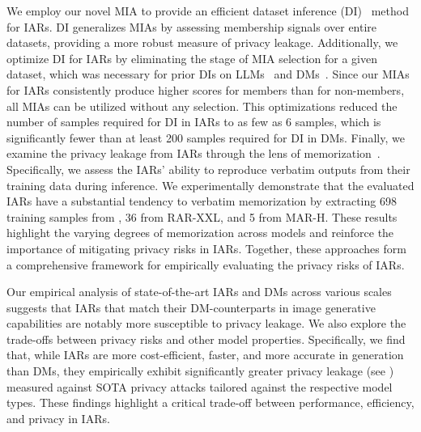 We employ our novel MIA to provide an efficient dataset inference (DI)~\citep{maini2021dataset} method for IARs. DI generalizes MIAs by assessing membership signals over entire datasets, providing a more robust measure of privacy leakage. Additionally, we optimize DI for IARs by eliminating the stage of MIA selection for a given dataset, which was necessary for prior DIs on LLMs~\citep{maini2024llmdatasetinferencedid} and DMs~\citep{dubinski2024cdicopyrighteddataidentification}. Since our MIAs for IARs consistently produce higher scores for members than for non-members, all MIAs can be utilized without any selection. This optimizations reduced the number of samples required for DI in IARs to as few as 6 samples, which is significantly fewer than at least 200 samples required for DI in DMs. 
Finally, we examine the privacy leakage from IARs through the lens of memorization~\citep{feldman2020does,wen2024detecting,huang2024demystifying}. Specifically, we assess the IARs’ ability to reproduce verbatim outputs from their training data during inference.  We experimentally demonstrate that the evaluated IARs have a substantial tendency to verbatim memorization by extracting 698 training samples from \varbig, 36 from RAR-XXL, and 5 from MAR-H. These results highlight the varying degrees of memorization across models and reinforce the importance of mitigating privacy risks in IARs. Together, these approaches form a comprehensive framework for empirically evaluating the privacy risks of IARs.




Our empirical analysis of state-of-the-art IARs and DMs across various scales suggests that IARs that match their DM-counterparts in image generative capabilities are notably more susceptible to privacy leakage. We also explore the trade-offs between privacy risks and other model properties. Specifically, we find that, while IARs are more cost-efficient, faster, and more accurate in generation than DMs, they empirically exhibit significantly greater privacy leakage (see ) measured against SOTA privacy attacks tailored against the respective model types. These findings highlight a critical trade-off between performance, efficiency, and privacy in IARs.

